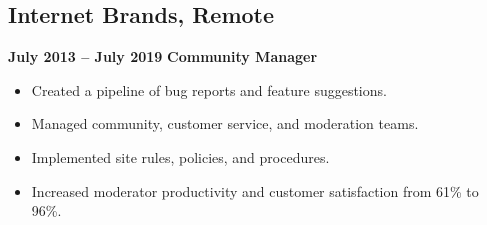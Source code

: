 \documentclass[a4paper,10pt]{article}
\begin{document}
\begin{flushleft}
    \subsection{Internet Brands, Remote} \hfill \textbf{July 2013 – July 2019}
    \textbf{Community Manager}
    \begin{itemize}[leftmargin=0.5em]
        \item Created a pipeline of bug reports and feature suggestions.
        \item Managed community, customer service, and moderation teams.
        \item Implemented site rules, policies, and procedures.
        \item Increased moderator productivity and customer satisfaction from
              61\%
              to 96\%.
    \end{itemize}

\end{flushleft}
\end{document}
